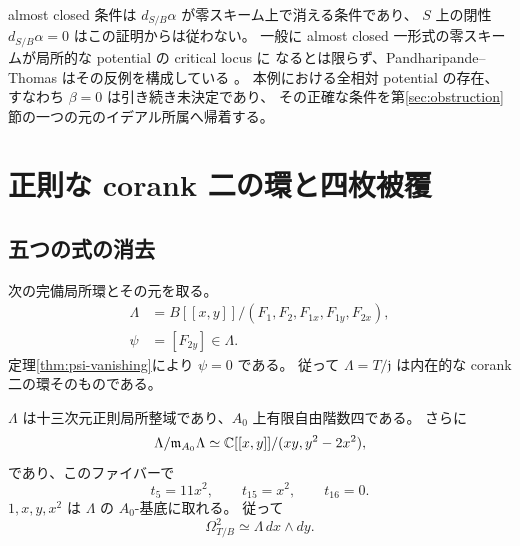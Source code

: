 almost closed 条件は $d_{S/B}\alpha$ が零スキーム上で消える条件であり、
$S$ 上の閉性 $d_{S/B}\alpha=0$ はこの証明からは従わない。
一般に almost closed 一形式の零スキームが局所的な potential の critical locus に
なるとは限らず、Pandharipande--Thomas はその反例を構成している
\cite{PandharipandeThomasAlmostClosed}。
本例における全相対 potential の存在、すなわち $\beta=0$ は引き続き未決定であり、
その正確な条件を第\ref{sec:obstruction}節の一つの元のイデアル所属へ帰着する。

\section{正則な corank 二の環と四枚被覆}\label{sec:fourfold}

\subsection{五つの式の消去}

\begin{definition}
次の完備局所環とその元を取る。
\begin{align*}
\Lambda&=B[[x,y]]/(F_1,F_2,F_{1x},F_{1y},F_{2x}),\\
\psi&=[F_{2y}]\in\Lambda.
\end{align*}
定理\ref{thm:psi-vanishing}により $\psi=0$ である。
従って $\Lambda=T/\mathfrak j$ は内在的な corank 二の環そのものである。
\end{definition}

\begin{theorem}[四枚被覆]\label{thm:fourfold}
$\Lambda$ は十三次元正則局所整域であり、$A_0$ 上有限自由階数四である。
さらに
\begin{equation}\label{eq:lambda-fiber}
\Lambda/\mathfrak m_{A_0}\Lambda
\simeq\mathbb C[[x,y]]/(xy,y^2-2x^2),
\end{equation}
であり、このファイバーで
\[
t_5=11x^2,\qquad t_{15}=x^2,\qquad t_{16}=0.
\]
$1,x,y,x^2$ は $\Lambda$ の $A_0$-基底に取れる。
従って
\[
\Omega^2_{T/B}\simeq\Lambda\,dx\wedge dy.
\]
\end{theorem}

